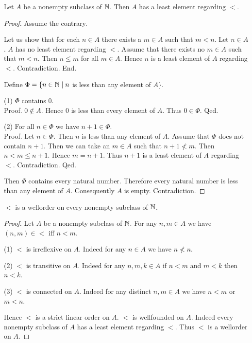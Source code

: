 \documentclass[../arithmetic.tex]{subfiles}
\begin{document}
  \begin{forthel}
    \begin{proposition}
      Let $A$ be a nonempty subclass of $\mathbb{N}$.
      Then $A$ has a least element regarding ${<}$.
    \end{proposition}
    \begin{proof}
      Assume the contrary.

      Let us show that for each $n \in A$ there exists a $m \in A$ such that
      $m < n$.
        Let $n \in A$.
        $A$ has no least element regarding ${<}$.
        Assume that there exists no $m \in A$ such that $m < n$.
        Then $n \leq m$ for all $m \in A$.
        Hence $n$ is a least element of $A$ regarding ${<}$.
        Contradiction.
      End.

      Define $\Phi = \{ n \in \mathbb{N} \mid n$ is less than any element of $A \}$.

      (1) $\Phi$ contains $0$. \\
      Proof.
        $0 \notin A$.
        Hence $0$ is less than every element of $A$.
        Thus $0 \in \Phi$.
      Qed.

      (2) For all $n \in \Phi$ we have $n + 1 \in \Phi$. \\
      Proof.
        Let $n \in \Phi$.
        Then $n$ is less than any element of $A$.
        Assume that $\Phi$ does not contain $n + 1$.
        Then we can take an $m \in A$ such that $n + 1 \nless m$.
        Then $n < m \leq n + 1$.
        Hence $m = n + 1$.
        Thus $n + 1$ is a least element of $A$ regarding ${<}$.
        Contradiction.
      Qed.

      Then $\Phi$ contains every natural number.
      Therefore every natural number is less than any element of $A$.
      Consequently $A$ is empty.
      Contradiction.
    \end{proof}
  \end{forthel}

  \begin{forthel}
    \begin{corollary}
      ${<}$ is a wellorder on every nonempty subclass of $\mathbb{N}$.
    \end{corollary}
    \begin{proof}
      Let $A$ be a nonempty subclass of $\mathbb{N}$.
      For any $n, m \in A$ we have $(n, m) \in {<}$ iff $n < m$.

      (1) ${<}$ is irreflexive on $A$.
      Indeed for any $n \in A$ we have $n \nless n$.

      (2) ${<}$ is transitive on $A$.
      Indeed for any $n, m, k \in A$ if $n < m$ and $m < k$ then $n < k$.

      (3) ${<}$ is connected on $A$.
      Indeed for any distinct $n, m \in A$ we have $n < m$ or $m < n$.

      Hence ${<}$ is a strict linear order on $A$.
      ${<}$ is wellfounded on $A$.
      Indeed every nonempty subclass of $A$ has a least element regarding ${<}$.
      Thus ${<}$ is a wellorder on $A$.
    \end{proof}
  \end{forthel}
\end{document}
